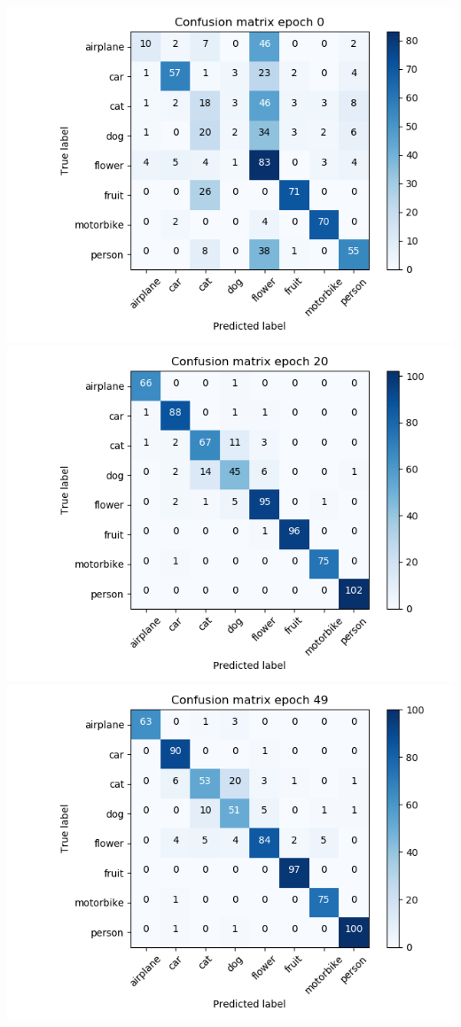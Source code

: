 \documentclass{article}
\begin{document}
\begin{minipage}[c]{\textwidth}
	\centering
	\includegraphics[width= \figureWidth\textwidth]{./figures/cm_h128_w128_r_none_e0.png}
	\includegraphics[width= \figureWidth\textwidth]{./figures/cm_h128_w128_r_none_e20.png}
	\includegraphics[width= \figureWidth\textwidth]{./figures/cm_h128_w128_r_none_e49.png}
	

\end{minipage}
\end{document}
